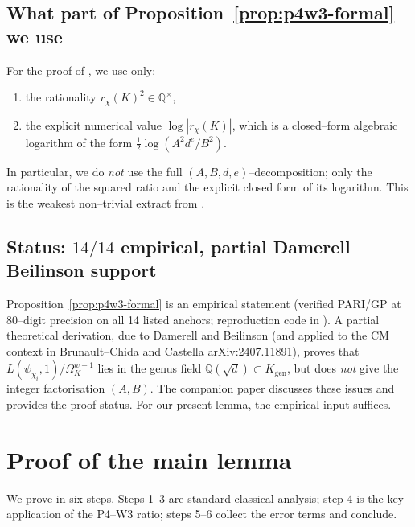 \documentclass[11pt]{amsart}
\theoremstyle{definition}
\theoremstyle{remark}
\newcommand{\Q}{\mathbb{Q}}
\begin{document}
\subsection{What part of Proposition~\ref{prop:p4w3-formal} we use}
\label{ssec:p4w3-used}
For the proof of , we use only:
\begin{enumerate}
  \item the rationality
  \(r_\chi(K)^2 \in \Q^\times\),
  \item the explicit numerical value
  \(\log|r_\chi(K)|\), which is a closed--form algebraic logarithm
  of the form \(\tfrac{1}{2}\log(A^2 d^e / B^2)\).
\end{enumerate}

In particular, we do \emph{not} use the full
\((A, B, d, e)\)--decomposition; only the rationality of the squared
ratio and the explicit closed form of its logarithm. This is the
weakest non--trivial extract from .

\subsection{Status: \(14/14\) empirical, partial Damerell--Beilinson
support}\label{ssec:p4w3-status}
Proposition~\ref{prop:p4w3-formal} is an empirical statement (verified
PARI/GP at \(80\)--digit precision on all 14 listed anchors;
reproduction code in ). A partial theoretical
derivation, due to Damerell \cite{Damerell1971} and Beilinson
\cite{Beilinson1984} (and applied to the CM
context in Brunault--Chida \cite{BrunaultChida2015} and
Castella \cite{Castella2024} arXiv:2407.11891), proves that
\(L(\psi_{\chi_i}, 1)/\Omega_K^{w-1}\) lies in the genus field
\(\Q(\sqrt d) \subset K_{\mathrm{gen}}\), but does \emph{not} give the
integer factorisation \((A, B)\). The companion paper
\cite{Remondiere2026bsd} discusses these issues and provides the
proof status. For our present lemma, the empirical input suffices.

\section{Proof of the main lemma}\label{sec:proof}

We prove  in six steps. Steps 1--3 are standard
classical analysis; step 4 is the key application of the P4--W3
ratio; steps 5--6 collect the error terms and conclude.
\end{document}
